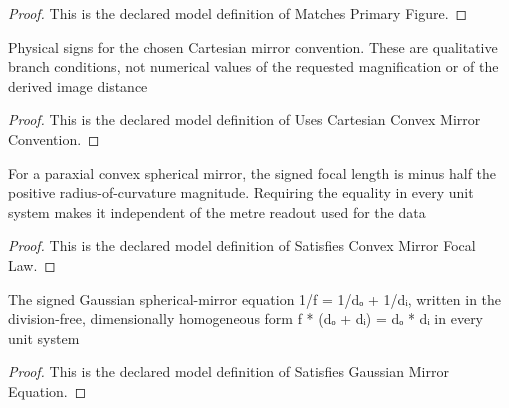 \begin{proof}
  This is the declared model definition of Matches Primary Figure.
\end{proof}
\begin{definition}
  \label{def:physics:phyx-mini-0139:phyxminiproblems-problemphyxmini0139-usescartesianconvexmirrorconvention}
  Physical signs for the chosen Cartesian mirror convention. These are qualitative branch conditions, not numerical values of the requested magnification or of the derived image distance
\end{definition}
\begin{proof}
  This is the declared model definition of Uses Cartesian Convex Mirror Convention.
\end{proof}
\begin{definition}
  \label{def:physics:phyx-mini-0139:phyxminiproblems-problemphyxmini0139-satisfiesconvexmirrorfocallaw}
  For a paraxial convex spherical mirror, the signed focal length is minus half the positive radius-of-curvature magnitude. Requiring the equality in every unit system makes it independent of the metre readout used for the data
\end{definition}
\begin{proof}
  This is the declared model definition of Satisfies Convex Mirror Focal Law.
\end{proof}
\begin{definition}
  \label{def:physics:phyx-mini-0139:phyxminiproblems-problemphyxmini0139-satisfiesgaussianmirrorequation}
  The signed Gaussian spherical-mirror equation 1/f = 1/dₒ + 1/dᵢ, written in the division-free, dimensionally homogeneous form f * (dₒ + dᵢ) = dₒ * dᵢ in every unit system
\end{definition}
\begin{proof}
  This is the declared model definition of Satisfies Gaussian Mirror Equation.
\end{proof}
